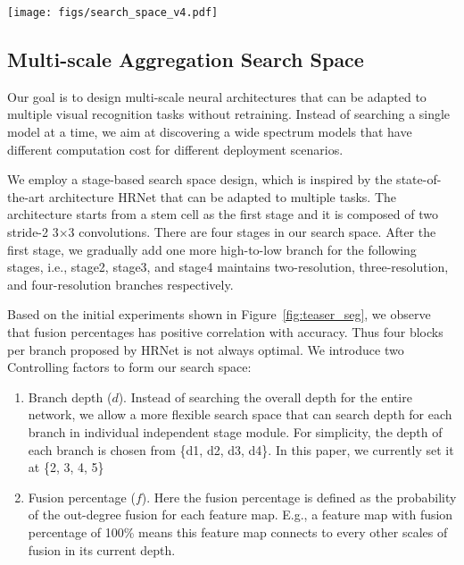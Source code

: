 \documentclass[final]{cvpr}
\newcommand{\workname}{ScaleNAS\xspace}
\begin{document}
\begin{figure*}[ht]
    \centering
    \texttt{[image: figs/search\_space\_v4.pdf]}
\caption{Search space overview of \workname. Our search space inherit the spirit of HRNet that has few stages. \workname adopts a flexible search space with arbitrary number of blocks and cross-scale feature fusions.
  }
    \label{fig:search_space}
\end{figure*}



\subsection{Multi-scale Aggregation Search Space}
\label{sec:search_space_design}

Our goal is to design multi-scale neural architectures that can be adapted to multiple visual recognition tasks without retraining. Instead of searching a single model at a time, we aim at discovering a wide spectrum models that have different computation cost for different deployment scenarios. 

We employ a stage-based search space design, which is inspired by the state-of-the-art architecture HRNet that can be adapted to multiple tasks.
The architecture starts from a stem cell as the first stage and it is composed of two stride-2 3$\times$3 convolutions. There are four stages in our search space. After the first stage, we gradually add one more high-to-low branch for the following stages, i.e., stage2, stage3, and stage4 maintains two-resolution, three-resolution, and four-resolution branches respectively.

Based on the initial experiments shown in Figure~\ref{fig:teaser_seg}, we observe that fusion percentages has positive correlation with accuracy. 
Thus four blocks per branch proposed by HRNet is not always optimal. 
We introduce two Controlling factors to form our search space: \
\begin{enumerate}
    \item Branch depth ($d$). Instead of searching the overall depth for the entire network, we allow a more flexible search space that can search depth for each branch in individual independent stage module. For simplicity, the depth of each branch is chosen from \{d1, d2, d3, d4\}. In this paper, we currently set it at \{2, 3, 4, 5\}
    \item Fusion percentage ($f$). Here the fusion percentage is defined as the probability of the out-degree fusion for each feature map. E.g., a feature map with fusion percentage of 100\% means this feature map connects to every other scales of fusion in its current depth.

\end{enumerate}
\end{document}
